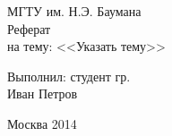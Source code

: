 \begin{center} 

\large МГТУ им. Н.Э. Баумана\\[5.5cm] 

\huge Реферат \\[0.6cm] %
\large на тему:  <<Указать тему>>\\[3.7cm]


\end{center} 

 \begin{flushright}
Выполнил: студент гр.  \\
Иван Петров \\
\end{flushright}


\vfill 

\begin{center} 
\large Москва 2014
\end{center} 

\thispagestyle{empty}